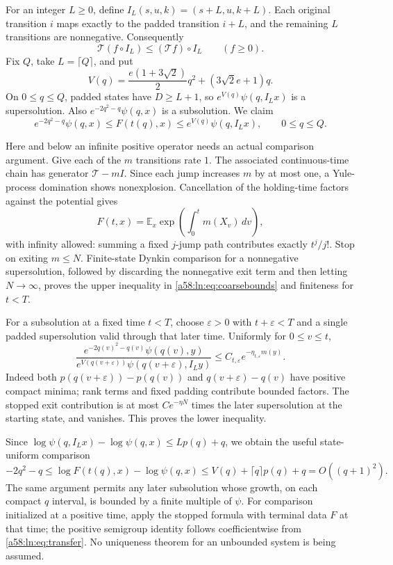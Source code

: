 \documentclass[11pt,letterpaper]{article}
\theoremstyle{remark}
\newcommand{\TT}{\mathcal T}
\newcommand{\E}{\mathbb E}
\newcommand{\dd}{\,d}
\begin{document}
For an integer $L\ge0$, define
$I_L(s,u,k)=(s+L,u,k+L)$. Each original transition $i$ maps exactly to
the padded transition $i+L$, and the remaining $L$ transitions are
nonnegative. Consequently
\begin{equation}\label{a58:ln:eq:padding}
 \TT(f\circ I_L)\le(\TT f)\circ I_L\qquad(f\ge0).
\end{equation}
Fix $Q$, take $L=\lceil Q\rceil$, and put
\[
 V(q)=\frac{e(1+3\sqrt2)}2q^2+(3\sqrt2e+1)q.
\]
On $0\le q\le Q$, padded states have $D\ge L+1$, so
$e^{V(q)}\psi(q,I_Lx)$ is a supersolution. Also
$e^{-2q^2-q}\psi(q,x)$ is a subsolution. We claim
\begin{equation}\label{a58:ln:eq:coarsebounds}
 e^{-2q^2-q}\psi(q,x)\le F(t(q),x)
 \le e^{V(q)}\psi(q,I_Lx),\qquad 0\le q\le Q.
\end{equation}

Here and below an infinite positive operator needs an actual comparison
argument. Give each of the $m$ transitions rate $1$. The associated
continuous-time chain has generator $\TT-mI$. Since each jump increases
$m$ by at most one, a Yule-process domination shows nonexplosion.
Cancellation of the holding-time factors against the potential gives
\begin{equation}\label{a58:ln:eq:fk}
 F(t,x)=\E_x\exp\left(\int_0^t m(X_v)\dd v\right),
\end{equation}
with infinity allowed: summing a fixed $j$-jump path contributes exactly
$t^j/j!$. Stop on exiting $m\le N$. Finite-state Dynkin comparison for
a nonnegative supersolution, followed by discarding the nonnegative
exit term and then letting $N\to\infty$, proves the upper inequality
in \eqref{a58:ln:eq:coarsebounds} and finiteness for $t<T$.

For a subsolution at a fixed time $t<T$, choose $\varepsilon>0$ with
$t+\varepsilon<T$ and a single padded supersolution valid through that
later time. Uniformly for $0\le v\le t$,
\[
 \frac{e^{-2q(v)^2-q(v)}\psi(q(v),y)}
 {e^{V(q(v+\varepsilon))}\psi(q(v+\varepsilon),I_Ly)}
 \le C_{t,\varepsilon}e^{-\eta_{t,\varepsilon}m(y)}.
\]
Indeed both $p(q(v+\varepsilon))-p(q(v))$ and
$q(v+\varepsilon)-q(v)$ have positive compact minima; rank terms and
fixed padding contribute bounded factors. The stopped exit contribution
is at most $C e^{-\eta N}$ times the later supersolution at the starting
state, and vanishes. This proves the lower inequality.

Since
$\log\psi(q,I_Lx)-\log\psi(q,x)\le Lp(q)+q$, we obtain the useful
state-uniform comparison
\begin{equation}\label{a58:ln:eq:coarseuniform}
 -2q^2-q\le\log F(t(q),x)-\log\psi(q,x)
 \le V(q)+\lceil q\rceil p(q)+q=O((q+1)^2).
\end{equation}
The same argument permits any later subsolution whose growth, on each
compact $q$ interval, is bounded by a finite multiple of $\psi$.
For comparison initialized at a positive time, apply the stopped formula
with terminal data $F$ at that time; the positive semigroup identity
follows coefficientwise from \eqref{a58:ln:eq:transfer}. No uniqueness theorem
for an unbounded system is being assumed.
\end{document}
